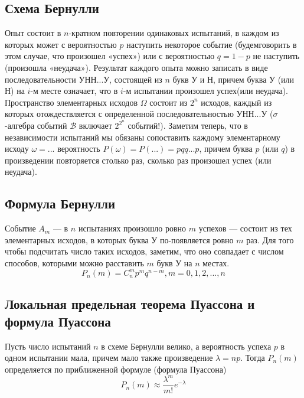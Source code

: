 \documentclass[12pt]{article}
\begin{document}
\subsection{Схема Бернулли}
Опыт состоит в $n$-кратном повторении одинаковых испытаний,
в каждом из которых может с вероятностью $p$ наступить некоторое событие
(будемговорить в этом случае, что произошел «успех»)
или с вероятностью $q = 1 - p$ не наступить (произошла «неудача»).
Результат каждого опыта можно записать в виде последовательности УНН...У, состоящей из $n$ букв У и Н,
причем буква У (или Н) на $i$-м месте означает, что в $i$-м испытании произошел успех(или неудача).
Пространство элементарных исходов $\Omega$ состоит из $2^n$ исходов,
каждый из которых отождествляется с определенной последовательностью УНН...У
($\sigma$-алгебра событий $\mathcal{B}$ включает $2^{2^n}$ событий!).
Заметим теперь, что в независимости испытаний мы обязаны сопоставить каждому элементарному исходу
$\omega = ...$ вероятность $P(\omega) = P(...) = pqq...p$,
причем буква $p$ (или $q$) в произведении повторяется столько раз,
сколько раз произошел успех (или неудача).


\subsection{Формула Бернулли}
Событие $A_m$ --- в $n$ испытаниях произошло ровно $m$ успехов --- состоит из тех элементарных исходов,
в которых буква У по-появляется ровно $m$ раз.
Для того чтобы подсчитать число таких исходов, заметим,
что оно совпадает с числом способов, которыми можно расставить $m$ букв У на $n$ местах.
\[P_n(m) = C^m_np^mq^{n - m}, m = 0, 1, 2, ..., n\]

\subsection{Локальная предельная теорема Пуассона и формула Пуассона}
Пусть число испытаний $n$ в схеме Бернулли велико,
а вероятность успеха $p$ в одном испытании мала,
причем мало также произведение $\lambda = np$.
Тогда $P_n(m)$ определяется по приближенной формуле (формула Пуассона)
\[P_n(m) \approx \frac{\lambda^m}{m!}e^{-\lambda}\]
\end{document}
